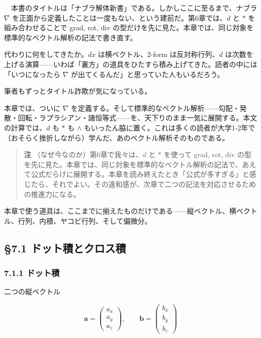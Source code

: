 \documentclass[a4paper,12pt,openany]{book}
\begin{document}
　本書のタイトルは「ナブラ解体新書」である。しかしここに至るまで、ナブラ
\(\nabla\)
を正面から定義したことは一度もない、という建前だ。第6章では、\(d\) と
\(\ast\) を組み合わせることで grad, rot, div
の型だけを先に見た。本章では、同じ対象を標準的なベクトル解析の記法で書き直す。

代わりに何をしてきたか。\(dx\) は横ベクトル、\(2\)-form
は反対称行列、\(d\)
は次数を上げる演算——いわば「裏方」の道具をひたすら積み上げてきた。読者の中には「いつになったら
\(\nabla\) が出てくるんだ」と思っていた人もいるだろう。

筆者もずっとタイトル詐欺が気になっている。

本章では、ついに \(\nabla\)
を定義する。そして標準的なベクトル解析——勾配・発散・回転・ラプラシアン・諸恒等式——を、天下りのまま一気に展開する。本文の計算では、\(d\)
も \(\ast\) も \(\wedge\)
もいったん脇に置く。これは多くの読者が大学1-2年で（おそらく挫折しながら）学んだ、あのベクトル解析そのものである。

\begin{quote}
\textbf{注} （なぜ今なのか）第6章で我々は、\(d\) と \(\ast\) を使って
grad, rot, div
の型を先に見た。本章では、同じ対象を標準的なベクトル解析の記法で、あえて公式だらけに展開する。本章を読み終えたとき「公式が多すぎる」と感じたら、それでよい。その違和感が、次章で二つの記法を対応させるための推進力になる。
\end{quote}

本章で使う道具は、ここまでに揃えたものだけである——縦ベクトル、横ベクトル、行列、内積、ヤコビ行列、そして偏微分。

\par\vspace{0.35em}\par

\hypertarget{ux30c9ux30c3ux30c8ux7a4dux3068ux30afux30edux30b9ux7a4d}{%
\subsection{§7.1
ドット積とクロス積}\label{ux30c9ux30c3ux30c8ux7a4dux3068ux30afux30edux30b9ux7a4d}}

\hypertarget{ux30c9ux30c3ux30c8ux7a4d}{%
\subsubsection{7.1.1 ドット積}\label{ux30c9ux30c3ux30c8ux7a4d}}

二つの縦ベクトル

\[
\mathbf{a}
=
\begin{pmatrix}
a_x\\
a_y\\
a_z
\end{pmatrix},
\qquad
\mathbf{b}
=
\begin{pmatrix}
b_x\\
b_y\\
b_z
\end{pmatrix}
\]
\end{document}
